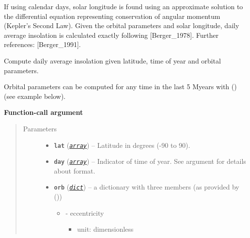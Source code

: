 \documentclass[a4paper,10pt,english]{sphinxmanual}
\begin{document}
If using calendar days, solar longitude is found using an
approximate solution to the differential equation representing conservation
of angular momentum (Kepler's Second Law).  Given the orbital parameters
and solar longitude, daily average insolation is calculated exactly
following {[}Berger\_1978{]}. Further references: {[}Berger\_1991{]}.

\begin{fulllineitems}
\label{api/climlab.solar:climlab.solar.insolation.daily_insolation}
Compute daily average insolation given latitude, time of year and orbital parameters.

Orbital parameters can be computed for any time in the last 5 Myears with
{\hyperref[api/climlab.solar:climlab.solar.orbital.OrbitalTable.lookup_parameters]{\emph{}}} () (see example below).

\textbf{Function-call argument}
\begin{quote}\begin{description}
\item[{Parameters}] \leavevmode\begin{itemize}
\item {} 
\textbf{\texttt{lat}} (\href{http://docs.python.org/2.7/library/array.html\#module-array}{\emph{\texttt{array}}}) -- Latitude in degrees (-90 to 90).

\item {} 
\textbf{\texttt{day}} (\href{http://docs.python.org/2.7/library/array.html\#module-array}{\emph{\texttt{array}}}) -- Indicator of time of year. See argument 
for details about format.

\item {} 
\textbf{\texttt{orb}} (\href{http://docs.python.org/2.7/library/stdtypes.html\#dict}{\emph{\texttt{dict}}}) -- 
a dictionary with three members (as provided by 
{\hyperref[api/climlab.solar:climlab.solar.orbital.OrbitalTable]{\emph{}}} ())
\begin{itemize}
\item {} 
 - eccentricity
\begin{itemize}
\item {} 
unit: dimensionless


\end{itemize}
\end{itemize}
\end{itemize}
\end{description}
\end{quote}
\end{fulllineitems}
\end{document}
